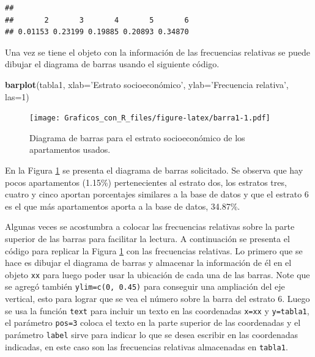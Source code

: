 \documentclass[10pt,]{krantz}
\makeatletter
\newenvironment{Shaded}{\begin{snugshade}}{\end{snugshade}}
\newcommand{\KeywordTok}[1]{\textcolor[rgb]{0.13,0.29,0.53}{\textbf{#1}}}
\newcommand{\DataTypeTok}[1]{\textcolor[rgb]{0.13,0.29,0.53}{#1}}
\newcommand{\StringTok}[1]{\textcolor[rgb]{0.31,0.60,0.02}{#1}}
\newcommand{\OperatorTok}[1]{\textcolor[rgb]{0.81,0.36,0.00}{\textbf{#1}}}
\newcommand{\NormalTok}[1]{#1}
\newenvironment{kframe}{%
\medskip{}
\setlength{\fboxsep}{.8em}
 \def\at@end@of@kframe{}%
 \ifinner\ifhmode%
  \def\at@end@of@kframe{\end{minipage}}%
  \begin{minipage}{\columnwidth}%
 \fi\fi%
 \def\FrameCommand##1{\hskip\@totalleftmargin \hskip-\fboxsep
 \colorbox{shadecolor}{##1}\hskip-\fboxsep
     \hskip-\linewidth \hskip-\@totalleftmargin \hskip\columnwidth}%
 \MakeFramed {\advance\hsize-\width
   \@totalleftmargin\z@ \linewidth\hsize
   \@setminipage}}%
 {\par\unskip\endMakeFramed%
 \at@end@of@kframe}
\renewenvironment{Shaded}{\begin{kframe}}{\end{kframe}}
\makeatother
\begin{document}
\begin{Shaded}
\end{Shaded}

\begin{verbatim}
## 
##       2       3       4       5       6 
## 0.01153 0.23199 0.19885 0.20893 0.34870
\end{verbatim}

Una vez se tiene el objeto con la información de las frecuencias
relativas se puede dibujar el diagrama de barras usando el siguiente
código.

\begin{Shaded}
\begin{Highlighting}[]
\KeywordTok{barplot}\NormalTok{(tabla1, }\DataTypeTok{xlab=}\StringTok{'Estrato socioeconómico',}
\StringTok{        ylab='}\NormalTok{Frecuencia relativa}\StringTok{', las=1)}
\end{Highlighting}
\end{Shaded}

\begin{figure}
\centering
\texttt{[image: Graficos\_con\_R\_files/figure-latex/barra1-1.pdf]}
\caption{\label{fig:barra1}Diagrama de barras para el estrato socioeconómico
de los apartamentos usados.}
\end{figure}

En la Figura \ref{fig:barra1} se presenta el diagrama de barras
solicitado. Se observa que hay pocos apartamentos (1.15\%)
pertenecientes al estrato dos, los estratos tres, cuatro y cinco aportan
porcentajes similares a la base de datos y que el estrato 6 es el que
más apartamentos aporta a la base de datos, 34.87\%.

Algunas veces se acostumbra a colocar las frecuencias relativas sobre la
parte superior de las barras para facilitar la lectura. A continuación
se presenta el código para replicar la Figura \ref{fig:barra1} con las
frecuencias relativas. Lo primero que se hace es dibujar el diagrama de
barras y almacenar la información de él en el objeto \texttt{xx} para
luego poder usar la ubicación de cada una de las barras. Note que se
agregó también \texttt{ylim=c(0,\ 0.45)} para conseguir una ampliación
del eje vertical, esto para lograr que se vea el número sobre la barra
del estrato 6. Luego se usa la función \texttt{text} para incluir un
texto en las coordenadas \texttt{x=xx} y \texttt{y=tabla1}, el parámetro
\texttt{pos=3} coloca el texto en la parte superior de las coordenadas y
el parámetro \texttt{label} sirve para indicar lo que se desea escribir
en las coordenadas indicadas, en este caso son las frecuencias relativas
almacenadas en \texttt{tabla1}.
\end{document}

